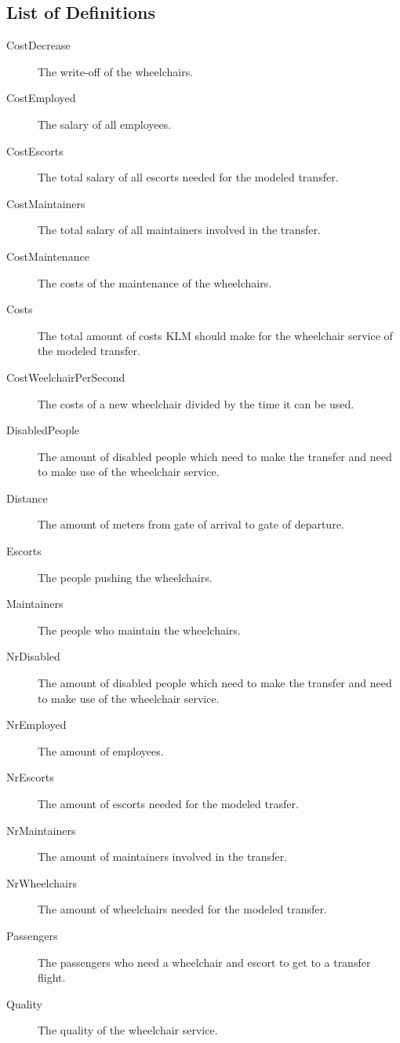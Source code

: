 \documentclass[a4paper, 11pt, notitlepage]{report}
\begin{document}
\begin{appendices}


{}



\chapter{List of Definitions}
\begin{description}

  \item[CostDecrease] The write-off of the wheelchairs.
  \item[CostEmployed] The salary of all employees.
  \item[CostEscorts] The total salary of all escorts needed for the modeled transfer.
  \item[CostMaintainers] The total salary of all maintainers involved in the transfer.
  \item[CostMaintenance] The costs of the maintenance of the wheelchairs.
  \item[Costs] The total amount of costs KLM should make for the wheelchair service of the modeled transfer.
  \item [CostWeelchairPerSecond] The costs of a new wheelchair divided by the time it can be used.
  \item[DisabledPeople] The amount of disabled people which need to make the transfer and need to make use of the wheelchair service.
  \item[Distance] The amount of meters from gate of arrival to gate of departure.
  \item[Escorts] The people pushing the wheelchairs.
  \item[Maintainers] The people who maintain the wheelchairs.
  \item[NrDisabled] The amount of disabled people which need to make the transfer and need to make use of the wheelchair service.
  \item[NrEmployed] The amount of employees.
  \item[NrEscorts] The amount of escorts needed for the modeled trasfer.
  \item[NrMaintainers] The amount of maintainers involved in the transfer.
  \item[NrWheelchairs] The amount of wheelchairs needed for the modeled transfer.
  \item[Passengers] The passengers who need a wheelchair and escort to get to a transfer flight.
  \item[Quality] The quality of the wheelchair service.

\end{description}
\end{appendices}
\end{document}
